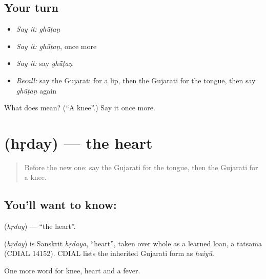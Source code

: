 \subsection*{Your turn}
\begin{itemize}
\raggedright
  \item \emph{Say it:} \emph{ghū̃ṭaṇ}
  \item \emph{Say it:} \emph{ghū̃ṭaṇ}, once more
  \item \emph{Say it:} say \emph{ghū̃ṭaṇ}
  \item \emph{Recall:} say the Gujarati for a lip, then the Gujarati for the tongue, then say \emph{ghū̃ṭaṇ} again
\end{itemize}

\begin{tcolorbox}[breakable,colback=teal!4,colframe=teal!35!black,title={Before you move on}]
What does  mean? (\textquotedblleft{}A knee\textquotedblright{}.) Say it once more.
\end{tcolorbox}
\section[\texorpdfstring{\gu{હૃદય} (hṛday)}{હૃદય (hṛday)}]{ (hṛday) — the heart}

\label{lesson:GU-C48-heart}



\begin{quote}
Before the new one: say the Gujarati for the tongue, then the Gujarati for a knee.
\end{quote}

\subsection*{You'll want to know: }
\textbf{} (\emph{hṛday}) — \textquotedblleft{}the heart\textquotedblright{}.

\begin{cousinweb}
\textbf{} (\emph{hṛday}) is Sanskrit \emph{hṛdaya}, \textquotedblleft{}heart\textquotedblright{}, taken over whole as a learned loan, a tatsama (CDIAL 14152). CDIAL lists the inherited Gujarati form as \emph{haiyũ}.
\end{cousinweb}

\begin{grammarlens}[title={What you've built}]
One more word for knee, heart and a fever.
\end{grammarlens}

